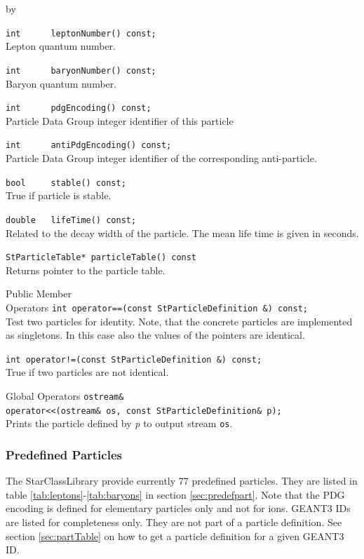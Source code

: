 \documentclass[twoside]{article}
\newcommand{\comp}[1]{\texttt{#1}}%
\newcommand{\args}[1]{\textit{#1}}%
\newcommand{\entrylabel}[1]{\mbox{\textbf{{#1}}}\hfil}%
\newenvironment{entry}
{\begin{list}{}%
    {\renewcommand{\makelabel}{\entrylabel}%
     \setlength{\labelwidth}{90pt}%
     \setlength{\leftmargin}{\labelwidth}
     \advance\leftmargin by \labelsep%
      }%
    }%
  {\end{list}}
\newcommand{\Entrylabel}[1]%
{\raisebox{0pt}[1ex][0pt]{\makebox[\labelwidth][l]%
    {\parbox[t]{\labelwidth}{\hspace{0pt}\textbf{{#1}}}}}}
\newenvironment{Entry}%
{\renewcommand{\entrylabel}{\Entrylabel}\begin{entry}}%
  {\end{entry}}
\begin{document}
\begin{description}
\begin{Entry}
    \verb+int      leptonNumber() const;+\\
    Lepton quantum number.
    
    \verb+int      baryonNumber() const;+\\
    Baryon quantum number.
    
    \verb+int      pdgEncoding() const;+\\
    Particle Data Group integer identifier of this particle

    \verb+int      antiPdgEncoding() const;+\\
    Particle Data Group integer identifier of the corresponding
    anti-particle.
    
    \verb+bool     stable() const;+\\
    True if particle is stable.
    
    \verb+double   lifeTime() const;+\\ 
    Related to the decay width of the particle.
    The mean life time is given in seconds.
    
    \verb+StParticleTable* particleTable() const+\\ 
    Returns pointer to the particle table.
    
\item[Public Member\\ Operators]
    \verb+int operator==(const StParticleDefinition &) const;+\\
    Test two particles for identity.
    Note, that the concrete particles are implemented as singletons.
    In this case also the values of the pointers are identical.
    
    \verb+int operator!=(const StParticleDefinition &) const;+\\ 
    True if two particles are not identical.
    
\item[Global Operators]
    \verb+ostream& +\\
    \verb+operator<<(ostream& os, const StParticleDefinition& p);+\\ 
    Prints the particle defined by \args{p} to output
    stream \comp{os}.
\end{Entry}

\subsubsection{Predefined Particles}

The StarClassLibrary provide currently 77 predefined particles. They are listed in
table \ref{tab:leptons}-\ref{tab:baryons} in section \ref{sec:predefpart}.
Note that the PDG encoding is  defined for elementary particles only
and not for ions. GEANT3 IDs are listed for completeness only. They are not
part of a particle definition. See section \ref{sec:partTable} on how to
get a particle definition for a given GEANT3 ID.


\end{description}
\end{document}
